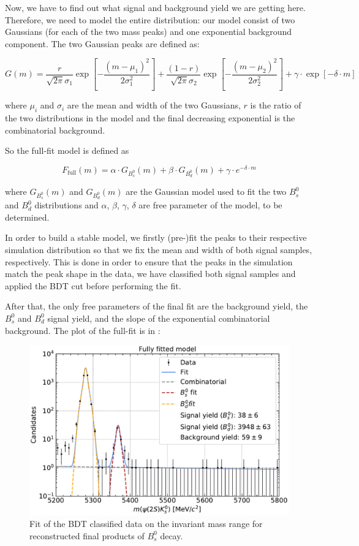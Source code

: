 Now, we have to find out what signal and background yield we are getting here. Therefore, we need to model the entire distribution: our model consist of two Gaussians (for each of the two mass peaks) and one exponential background component.
The two Gaussian peaks are defined as:

\begin{equation}
    G(m) = \frac{r}{\sqrt{2 \pi} \sigma_1} \exp \left[-\frac{\left(m-\mu_1\right)^2}{2 \sigma_1^2}\right]+ \frac{(1-r)}{\sqrt{2 \pi} \sigma_2} \exp \left[-\frac{\left(m-\mu_2\right)^2}{2 \sigma_2^2}\right] + \gamma \cdot \exp\left[- \delta \cdot m\right]
\end{equation}

where $\mu_i$ and $\sigma_i$ are the mean and width of the two Gaussians, $r$ is the ratio of the two distributions in the model and the final decreasing exponential is the combinatorial background.

So the full-fit model is defined as

\begin{equation}
    F_{\text{full}}(m) = \alpha \cdot G_{B_s^0}(m) + \beta \cdot G_{B_d^0}(m) + \gamma \cdot e^{- \delta \cdot m}
\end{equation}

where $G_{B_s^0}(m)$ and $G_{B_d^0}(m)$ are the Gaussian model used to fit the two $B_s^0$ and $B_d^0$ distributions and $\alpha$, $\beta$, $\gamma$, $\delta$ are free parameter of the model, to be determined.

In order to build a stable model, we firstly (pre-)fit the peaks to their respective simulation distribution so that we fix the mean and width of both signal samples, respectively. This is done in order to ensure that the peaks in the simulation match the peak shape in the data, we have classified both signal samples and applied the BDT cut before performing the fit.

After that, the only free parameters of the final fit are the background yield, the $B_s^0$ and $B_d^0$ signal yield, and the slope of the exponential combinatorial background. The plot of the full-fit is in :

\newpage
\begin{figure}[H]
    \centering
    \includegraphics[width=0.70\linewidth]{graphs/plot_fit.pdf}
    \caption{Fit of the BDT classified data on the invariant mass range for reconstructed final products of $B_{s}^{0}$ decay.}
    \label{fit}
\end{figure}

